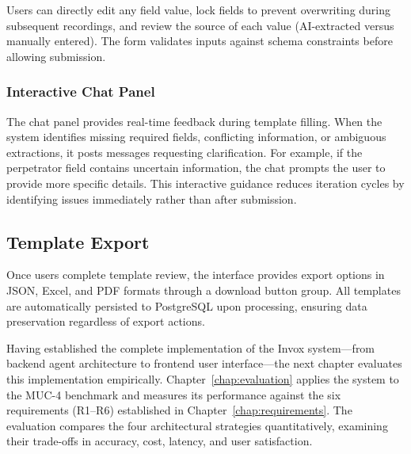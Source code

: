 Users can directly edit any field value, lock fields to prevent overwriting during subsequent recordings, and review the source of each value (AI-extracted versus manually entered). The form validates inputs against schema constraints before allowing submission.

\subsubsection{Interactive Chat Panel}

The chat panel provides real-time feedback during template filling. When the system identifies missing required fields, conflicting information, or ambiguous extractions, it posts messages requesting clarification. For example, if the perpetrator field contains uncertain information, the chat prompts the user to provide more specific details. This interactive guidance reduces iteration cycles by identifying issues immediately rather than after submission.

\subsection{Template Export}

Once users complete template review, the interface provides export options in JSON, Excel, and PDF formats through a download button group. All templates are automatically persisted to PostgreSQL upon processing, ensuring data preservation regardless of export actions.

Having established the complete implementation of the Invox system—from backend agent architecture to frontend user interface—the next chapter evaluates this implementation empirically. Chapter~\ref{chap:evaluation} applies the system to the MUC-4 benchmark and measures its performance against the six requirements (R1–R6) established in Chapter~\ref{chap:requirements}. The evaluation compares the four architectural strategies quantitatively, examining their trade-offs in accuracy, cost, latency, and user satisfaction.